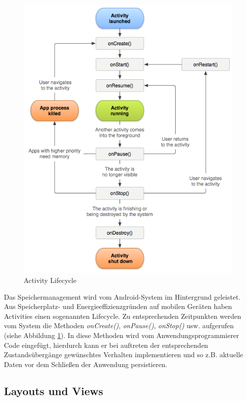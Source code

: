 \begin{figure}[ht]
\centering
\includegraphics[width=\textwidth]{../img/ActivityLifecycle.png}
\caption{Activity Lifecycle}
\label{fig:activitylifecycle}
\end{figure}

Das Speichermanagement wird vom Android-System im Hintergrund geleistet. Aus Speicherplatz- und Energieeffizienzgründen auf mobilen Geräten haben Activities einen sogenannten Lifecycle. Zu entsprechenden Zeitpunkten werden vom System die Methoden \emph{onCreate()}, \emph{onPause()}, \emph{onStop()} usw. aufgerufen (siehe Abbildung \ref{fig:activitylifecycle}). In diese Methoden wird vom Anwendungsprogrammierer Code eingefügt, hierdurch kann er bei auftreten der entsprechenden Zustandsübergänge gewünschtes Verhalten implementieren und so z.B. aktuelle Daten vor dem Schließen der Anwendung persistieren.

\subsection{Layouts und Views}

